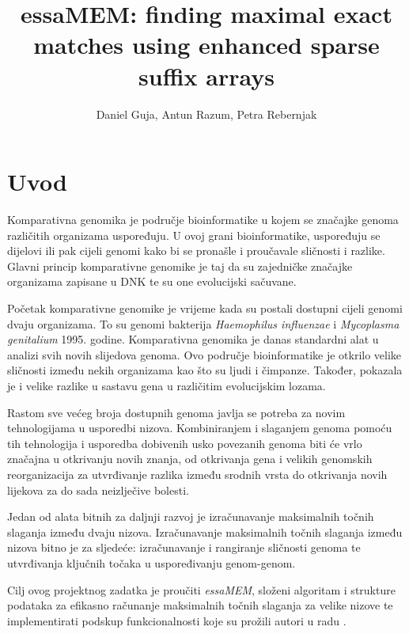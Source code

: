 \documentclass[times, utf8, seminar, numeric]{fer}
\begin{document}
\title{essaMEM: finding maximal exact matches using enhanced sparse suffix arrays}
\author{Daniel Guja, Antun Razum, Petra Rebernjak}

\maketitle
\tableofcontents

\chapter{Uvod}
Komparativna genomika je područje bioinformatike u kojem se značajke genoma različitih organizama uspoređuju. U ovoj grani bioinformatike, uspoređuju se dijelovi ili pak cijeli genomi kako bi se pronašle i proučavale sličnosti i razlike. Glavni princip komparativne genomike je taj da su zajedničke značajke organizama zapisane u DNK te su one evolucijski sačuvane.

Početak komparativne genomike je vrijeme kada su postali dostupni cijeli genomi dvaju organizama. To su genomi bakterija \textit{Haemophilus influenzae} i \textit{Mycoplasma genitalium} 1995. godine. Komparativna genomika je danas standardni alat u analizi svih novih slijedova genoma. Ovo područje bioinformatike je otkrilo velike sličnosti između nekih organizama kao što su ljudi i čimpanze. Također, pokazala je i velike razlike u sastavu gena u različitim evolucijskim lozama.

Rastom sve većeg broja dostupnih genoma javlja se potreba za novim tehnologijama u usporedbi nizova. Kombiniranjem i slaganjem genoma pomoću tih tehnologija i usporedba dobivenih usko povezanih genoma biti će vrlo značajna u otkrivanju novih znanja, od otkrivanja gena i velikih genomskih reorganizacija za utvrđivanje razlika između srodnih vrsta do otkrivanja novih lijekova za do sada neizlječive bolesti.

Jedan od alata bitnih za daljnji razvoj je izračunavanje maksimalnih točnih slaganja između dvaju nizova. Izračunavanje maksimalnih točnih slaganja između nizova bitno je za sljedeće: izračunavanje i rangiranje sličnosti genoma te utvrđivanja ključnih točaka u uspoređivanju genom-genom.

Cilj ovog projektnog zadatka je proučiti \textit{essaMEM}, složeni algoritam i strukture podataka za efikasno računanje maksimalnih točnih slaganja za velike nizove te implementirati podskup funkcionalnosti koje su prožili autori u radu \cite{essa}.
\end{document}
